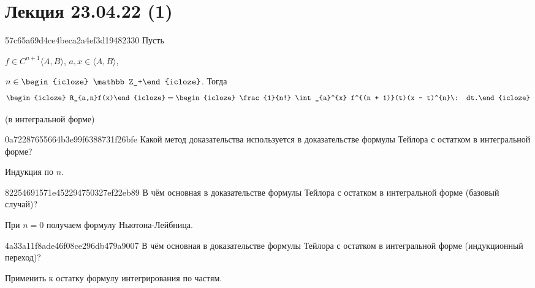 \section{Лекция 23.04.22 (1)}
\begin{note}{57c65a69d4ce4beca2a4ef3d19482330}
    Пусть \begin{icloze}{3}\({ f \in C^{n + 1}\langle A, B \rangle }\), \({ a, x \in \langle A, B \rangle }\),\end{icloze}\: \({ n \in \begin{icloze}{4}\mathbb Z_+\end{icloze} }\).
    Тогда
    \[
        \begin{icloze}{2}R_{a,n}f(x)\end{icloze} = \begin{icloze}{1}\frac{1}{n!} \int_{a}^{x} f^{(n + 1)}(t)(x - t)^{n}\: dt.\end{icloze}
    \]

    \begin{center}
        \tiny
        (в интегральной форме)
    \end{center}
\end{note}

\begin{note}{0a72287655664b3e99f6388731f26bfe}
    Какой метод доказательства используется в доказательстве формулы Тейлора с остатком в интегральной форме?

    \begin{cloze}{1}
        Индукция по \({ n }\).
    \end{cloze}
\end{note}

\begin{note}{82254691571e452294750327ef22eb89}
    В чём основная в доказательстве формулы Тейлора с остатком в интегральной форме (базовый случай)?

    \begin{cloze}{1}
        При \({ n = 0 }\) получаем формулу Ньютона-Лейбница.
    \end{cloze}
\end{note}

\begin{note}{4a33a11f8ade46f08ce296db479a9007}
    В чём основная в доказательстве формулы Тейлора с остатком в интегральной форме (индукционный переход)?

    \begin{cloze}{1}
        Применить к остатку формулу интегрирования по частям.
    \end{cloze}
\end{note}

